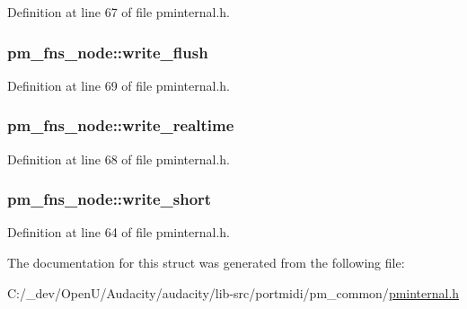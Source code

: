 Definition at line 67 of file pminternal.\+h.

\subsubsection[{\texorpdfstring{write\+\_\+flush}{write_flush}}]{ pm\+\_\+fns\+\_\+node\+::write\+\_\+flush}\hypertarget{structpm__fns__node_a507449c19eee96a72872fb16c443b197}{}\label{structpm__fns__node_a507449c19eee96a72872fb16c443b197}


Definition at line 69 of file pminternal.\+h.

\subsubsection[{\texorpdfstring{write\+\_\+realtime}{write_realtime}}]{ pm\+\_\+fns\+\_\+node\+::write\+\_\+realtime}\hypertarget{structpm__fns__node_a43aa6c0c76ae0d235fde4a0afce51cf8}{}\label{structpm__fns__node_a43aa6c0c76ae0d235fde4a0afce51cf8}


Definition at line 68 of file pminternal.\+h.

\subsubsection[{\texorpdfstring{write\+\_\+short}{write_short}}]{ pm\+\_\+fns\+\_\+node\+::write\+\_\+short}\hypertarget{structpm__fns__node_a9ab405eee09c3e4ee7e145c3d0b20d44}{}\label{structpm__fns__node_a9ab405eee09c3e4ee7e145c3d0b20d44}


Definition at line 64 of file pminternal.\+h.



The documentation for this struct was generated from the following file\+:\begin{DoxyCompactItemize}
\item 
C\+:/\+\_\+dev/\+Open\+U/\+Audacity/audacity/lib-\/src/portmidi/pm\+\_\+common/\hyperlink{pminternal_8h}{pminternal.\+h}\end{DoxyCompactItemize}
